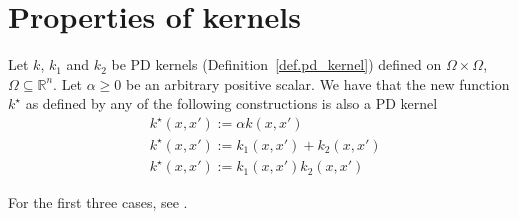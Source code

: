 




\chapter{Properties of kernels}

Let $k$, $k_1$ and $k_2$ be PD kernels (Definition~\ref{def.pd_kernel}) defined on $\Omega \times \Omega$, $\Omega \subseteq \mathbb{R}^n$. Let $\alpha \geq 0$ be an arbitrary positive scalar. We have that the new function $k^\star$ as defined by any of the following constructions is also a PD kernel
\begin{align}
	& k^\star(x,x') := \alpha k(x,x') \\
	& k^\star(x,x') := k_1(x,x') + k_2(x,x') \\
	& k^\star(x,x') := k_1(x,x') k_2(x,x') 
\end{align}

\begin{my_proof}
	For the first three cases, see \cite[§4]{steinwart2008svm_book}.
\end{my_proof}

